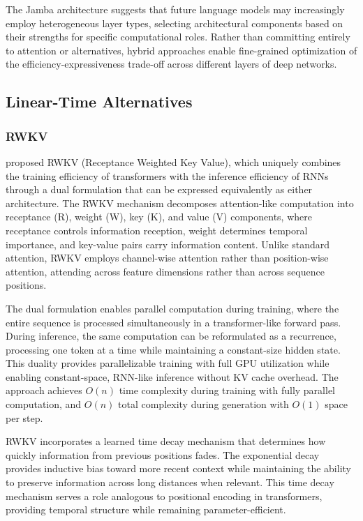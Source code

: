 The Jamba architecture suggests that future language models may increasingly employ heterogeneous layer types, selecting architectural components based on their strengths for specific computational roles. Rather than committing entirely to attention or alternatives, hybrid approaches enable fine-grained optimization of the efficiency-expressiveness trade-off across different layers of deep networks.

\subsection{Linear-Time Alternatives}

\subsubsection{RWKV}

\citet{peng2023rwkv} proposed RWKV (Receptance Weighted Key Value), which uniquely combines the training efficiency of transformers with the inference efficiency of RNNs through a dual formulation that can be expressed equivalently as either architecture. The RWKV mechanism decomposes attention-like computation into receptance (R), weight (W), key (K), and value (V) components, where receptance controls information reception, weight determines temporal importance, and key-value pairs carry information content. Unlike standard attention, RWKV employs channel-wise attention rather than position-wise attention, attending across feature dimensions rather than across sequence positions.

The dual formulation enables parallel computation during training, where the entire sequence is processed simultaneously in a transformer-like forward pass. During inference, the same computation can be reformulated as a recurrence, processing one token at a time while maintaining a constant-size hidden state. This duality provides parallelizable training with full GPU utilization while enabling constant-space, RNN-like inference without KV cache overhead. The approach achieves $O(n)$ time complexity during training with fully parallel computation, and $O(n)$ total complexity during generation with $O(1)$ space per step.

RWKV incorporates a learned time decay mechanism that determines how quickly information from previous positions fades. The exponential decay provides inductive bias toward more recent context while maintaining the ability to preserve information across long distances when relevant. This time decay mechanism serves a role analogous to positional encoding in transformers, providing temporal structure while remaining parameter-efficient.

